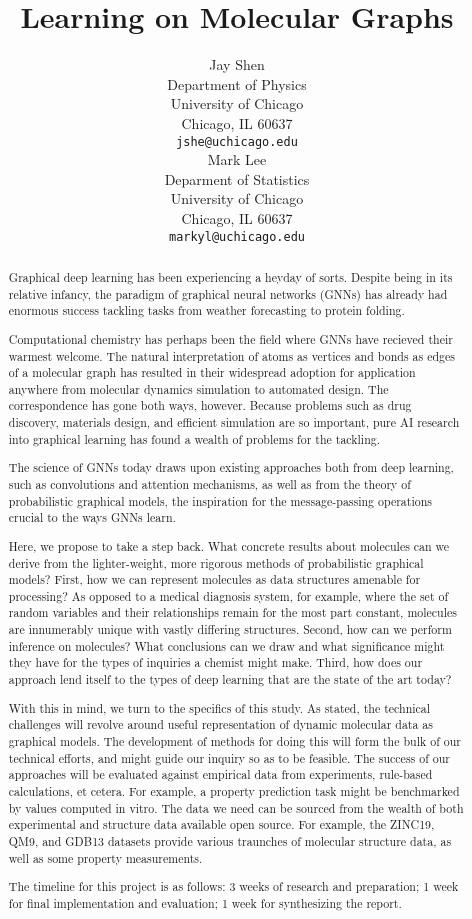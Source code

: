 \documentclass{article}
\title{Learning on Molecular Graphs}
\author{
  Jay Shen \\
  Department of Physics \\
  University of Chicago\\
  Chicago, IL 60637 \\
  \texttt{jshe@uchicago.edu} \\
  \And
  Mark Lee \\
  Deparment of Statistics \\
  University of Chicago \\
  Chicago, IL 60637 \\
  \texttt{markyl@uchicago.edu} \\
}
\begin{document}
\maketitle

\begin{abstract}
    Graphical deep learning has been experiencing a heyday of sorts. Despite 
    being in its relative infancy, the paradigm of graphical neural networks 
    (GNNs) has already had enormous success tackling tasks from weather 
    forecasting to protein folding. 

    Computational chemistry has perhaps been the field where GNNs have recieved 
    their warmest welcome. The natural interpretation of atoms as vertices and 
    bonds as edges of a molecular graph has resulted in their widespread 
    adoption for application anywhere from molecular dynamics simulation to 
    automated design. The correspondence has gone both ways, however. Because 
    problems such as drug discovery, materials design, and efficient simulation 
    are so important, pure AI research into graphical learning has found a 
    wealth of problems for the tackling. 

    The science of GNNs today draws upon existing approaches both from deep 
    learning, such as convolutions and attention mechanisms, as well as from the 
    theory of probabilistic graphical models, the inspiration for the 
    message-passing operations crucial to the ways GNNs learn. 

    Here, we propose to take a step back. What concrete results about molecules 
    can we derive from the lighter-weight, more rigorous methods of 
    probabilistic graphical models? First, how we can represent molecules as 
    data structures amenable for processing? As opposed to a medical diagnosis 
    system, for example, where the set of random variables and their 
    relationships remain for the most part constant, molecules are innumerably 
    unique with vastly differing structures. Second, how can we perform 
    inference on molecules? What conclusions can we draw and what significance 
    might they have for the types of inquiries a chemist might make. 
    Third, how does our approach lend itself to the types of deep learning that 
    are the state of the art today?

    With this in mind, we turn to the specifics of this study. As stated, the 
    technical challenges will revolve around useful representation of dynamic 
    molecular data as graphical models. The development of methods for doing 
    this will form the bulk of our technical efforts, and might guide our 
    inquiry so as to be feasible. The success of our approaches will be 
    evaluated against empirical data from experiments, rule-based calculations, 
    et cetera. For example, a property prediction task might be benchmarked by 
    values computed in vitro. The data we need can be sourced from the wealth of 
    both experimental and structure data available open source. For example, the 
    ZINC19, QM9, and GDB13 datasets provide various traunches of molecular 
    structure data, as well as some property measurements. 

    The timeline for this project is as follows: 3 weeks of research and 
    preparation; 1 week for final implementation and evaluation; 1 week for 
    synthesizing the report. 
    
\end{abstract}
\end{document}
